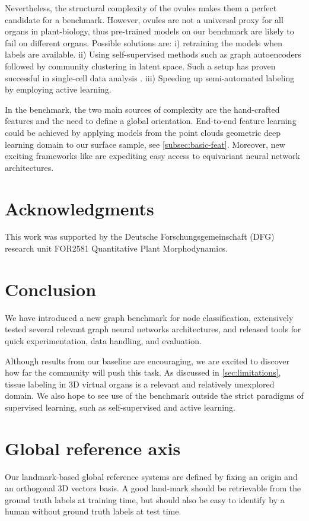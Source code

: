 \documentclass[10pt,twocolumn,letterpaper]{article}
\begin{document}
Nevertheless, the structural complexity of the ovules makes them a perfect candidate for a benchmark. However, ovules are not a universal proxy for all organs in plant-biology, thus pre-trained models on our benchmark are likely to fail on different organs. Possible solutions are: i) retraining the models when labels are available. ii) Using self-supervised methods such as graph autoencoders \cite{kipf2016variational, salehi2020graph} followed by community clustering in latent space. Such a setup has proven successful in single-cell data analysis \cite{amodio2019exploring, lopez2017deep}. iii) Speeding up semi-automated labeling by employing active learning.

In the benchmark, the two main sources of complexity are the hand-crafted features and the need to define a global orientation. End-to-end feature learning could be achieved by applying models from the point clouds geometric deep learning domain \cite{qi2017pointnet, qi2017pointnet++, li2018pointcnn} to our surface sample, see \cref{subsec:basic-feat}. Moreover, new exciting frameworks like \cite{e3nn} are expediting easy access to equivariant neural network architectures.

\section{Acknowledgments}
This work was supported by the Deutsche Forschungsgemeinschaft (DFG) research unit FOR2581 Quantitative Plant
Morphodynamics.

\section{Conclusion}
We have introduced a new graph benchmark for node classification, extensively tested several relevant graph neural networks architectures, and released tools for quick experimentation, data handling, and evaluation.

Although results from our baseline are encouraging, we are excited to discover how far the community will push this task. As discussed in \cref{sec:limitations}, tissue labeling in 3D virtual organs is a relevant and relatively unexplored domain. We also hope to see use of the benchmark outside the strict paradigms of supervised learning, such as self-supervised and active learning.
{\small


}

\clearpage
\appendix
\section{Global reference axis}
\label{suppl:sec1}
Our landmark-based global reference systems are defined by fixing an origin and an orthogonal 3D vectors basis. A good land-mark should be retrievable from the ground truth labels at training time, but should also be easy to identify by a human without ground truth labels at test time.
\end{document}
